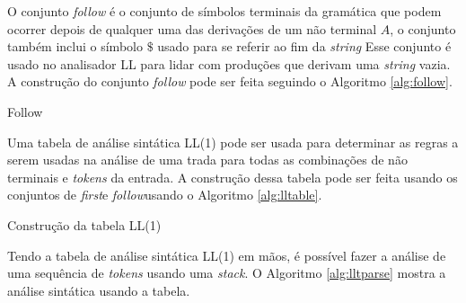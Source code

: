 O conjunto \textit{follow} é o conjunto de símbolos terminais da gramática que podem ocorrer depois de qualquer uma das derivações de um não terminal $A$, o conjunto também inclui o símbolo $\$$ usado para se referir ao fim da \textit{string} Esse conjunto é usado no analisador LL para lidar com produções que derivam uma \textit{string} vazia. A construção do conjunto \textit{follow} pode ser feita seguindo o Algoritmo \ref{alg:follow}.

\begin{algorithm}[htp]
    \caption{Follow}\label{alg:follow}
\end{algorithm}
\FloatBarrier

Uma tabela de análise sintática LL(1) pode ser usada para determinar as regras a serem usadas na análise de uma trada para todas as combinações de não terminais e \textit{tokens} da entrada. A construção dessa tabela pode ser feita usando os conjuntos de \textit{first}e \textit{follow}usando o Algoritmo \ref{alg:lltable}.

\begin{algorithm}[htp]
    \caption { Construção da tabela LL(1)}\label{alg:lltable}
    
\end{algorithm}
\FloatBarrier

Tendo a tabela de análise sintática LL(1) em mãos, é possível fazer a análise de uma sequência de \textit{tokens} usando uma \textit{stack}. O Algoritmo \ref{alg:lltparse} mostra a análise sintática usando a tabela. 

